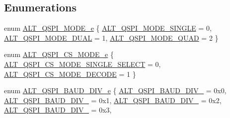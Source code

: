 \subsection*{Enumerations}
\begin{DoxyCompactItemize}
\item 
enum \mbox{\hyperlink{group__ALT__QSPI__DEV__CFG_ga9270168a24ae2256573f5c8cbc5ec691}{A\+L\+T\+\_\+\+Q\+S\+P\+I\+\_\+\+M\+O\+D\+E\+\_\+e}} \{ \mbox{\hyperlink{group__ALT__QSPI__DEV__CFG_gga9270168a24ae2256573f5c8cbc5ec691afb96856dab19888c593c7fe78b5edf88}{A\+L\+T\+\_\+\+Q\+S\+P\+I\+\_\+\+M\+O\+D\+E\+\_\+\+S\+I\+N\+G\+LE}} = 0, 
\mbox{\hyperlink{group__ALT__QSPI__DEV__CFG_gga9270168a24ae2256573f5c8cbc5ec691a2be68997cef72630cee7ded3508411b6}{A\+L\+T\+\_\+\+Q\+S\+P\+I\+\_\+\+M\+O\+D\+E\+\_\+\+D\+U\+AL}} = 1, 
\mbox{\hyperlink{group__ALT__QSPI__DEV__CFG_gga9270168a24ae2256573f5c8cbc5ec691a9283c5071f2cb9b4f2efad83f9ed077f}{A\+L\+T\+\_\+\+Q\+S\+P\+I\+\_\+\+M\+O\+D\+E\+\_\+\+Q\+U\+AD}} = 2
 \}
\item 
enum \mbox{\hyperlink{group__ALT__QSPI__DEV__CFG_ga1963b85b7d2bbc2e56ba43d807c9c1b0}{A\+L\+T\+\_\+\+Q\+S\+P\+I\+\_\+\+C\+S\+\_\+\+M\+O\+D\+E\+\_\+e}} \{ \mbox{\hyperlink{group__ALT__QSPI__DEV__CFG_gga1963b85b7d2bbc2e56ba43d807c9c1b0a861f8eecff9a1a5c9ffaaae955e19c9a}{A\+L\+T\+\_\+\+Q\+S\+P\+I\+\_\+\+C\+S\+\_\+\+M\+O\+D\+E\+\_\+\+S\+I\+N\+G\+L\+E\+\_\+\+S\+E\+L\+E\+CT}} = 0, 
\mbox{\hyperlink{group__ALT__QSPI__DEV__CFG_gga1963b85b7d2bbc2e56ba43d807c9c1b0a91cc34e8b7f68e5b01bfa136ac495e9b}{A\+L\+T\+\_\+\+Q\+S\+P\+I\+\_\+\+C\+S\+\_\+\+M\+O\+D\+E\+\_\+\+D\+E\+C\+O\+DE}} = 1
 \}
\item 
enum \mbox{\hyperlink{group__ALT__QSPI__DEV__CFG_gabea2bac97b47b7da32cf093e97de90e8}{A\+L\+T\+\_\+\+Q\+S\+P\+I\+\_\+\+B\+A\+U\+D\+\_\+\+D\+I\+V\+\_\+e}} \{ \newline
\mbox{\hyperlink{group__ALT__QSPI__DEV__CFG_ggabea2bac97b47b7da32cf093e97de90e8ab5cd16d0d185fd1705e8d0aab1a68e05}{A\+L\+T\+\_\+\+Q\+S\+P\+I\+\_\+\+B\+A\+U\+D\+\_\+\+D\+I\+V\+\_}} = 0x0, 
\mbox{\hyperlink{group__ALT__QSPI__DEV__CFG_ggabea2bac97b47b7da32cf093e97de90e8ad64febf6b3beb2a14a58f731e33cc344}{A\+L\+T\+\_\+\+Q\+S\+P\+I\+\_\+\+B\+A\+U\+D\+\_\+\+D\+I\+V\+\_}} = 0x1, 
\mbox{\hyperlink{group__ALT__QSPI__DEV__CFG_ggabea2bac97b47b7da32cf093e97de90e8a508ebd2aa0135751e08048c9833cc0ab}{A\+L\+T\+\_\+\+Q\+S\+P\+I\+\_\+\+B\+A\+U\+D\+\_\+\+D\+I\+V\+\_}} = 0x2, 
\mbox{\hyperlink{group__ALT__QSPI__DEV__CFG_ggabea2bac97b47b7da32cf093e97de90e8a0043e08642b406cbdef6d3c0faa95c37}{A\+L\+T\+\_\+\+Q\+S\+P\+I\+\_\+\+B\+A\+U\+D\+\_\+\+D\+I\+V\+\_}} = 0x3, 

\end{DoxyCompactItemize}
